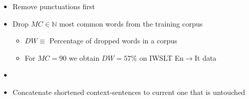 \documentclass[11pt, a4paper, landscape]{article}
\begin{document}
\NewPage
{}
\vfill
\begin{itemize}
	\item Remove punctuations first
	\item Drop $MC\in\mathbb{N}$ most common words from the training corpus
	\begin{itemize}
		\item $DW \equiv$ Percentage of dropped words in a corpus
		\item For $MC=90$ we obtain $DW=57\%$ on IWSLT En$\to$It data
	\end{itemize}
\end{itemize}
\vspace*{1cm}
\begin{center}
\end{center}
\begin{itemize}
	\item[]
	\item Concatenate shortened context-sentences to current one that is untouched
\end{itemize}
\vfill
\end{document}
